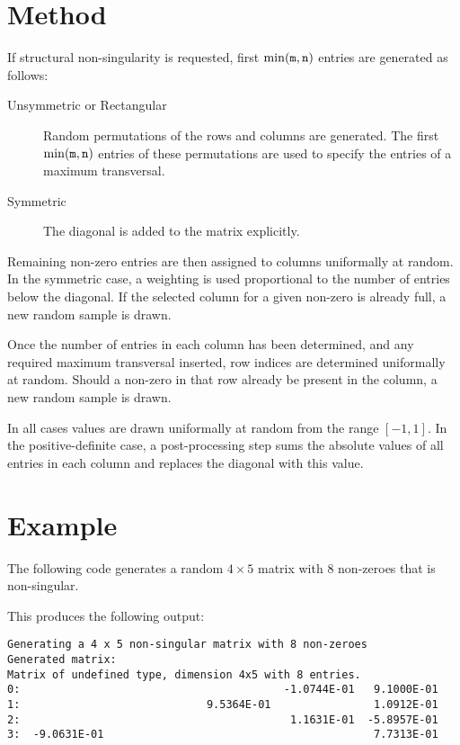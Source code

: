 \section{Method} \label{method}

If structural non-singularity is requested, first $\min({\tt m}, {\tt n})$ entries are generated as follows:
\begin{description}
   \item[Unsymmetric or Rectangular] Random permutations of the rows and
      columns are generated. The first $\min({\tt m}, {\tt n})$ entries of
      these permutations are used to specify the entries of a maximum
      transversal.
   \item[Symmetric] The diagonal is added to the matrix explicitly.
\end{description}

Remaining non-zero entries are then assigned to columns uniformally at
random. In the symmetric case, a weighting is used proportional to the number of
entries below the diagonal. If the selected column for a given non-zero is 
already full, a new random sample is drawn.

Once the number of entries in each column has been determined, and any required
maximum transversal inserted, row indices are determined uniformally at random.
Should a non-zero in that row already be present in the column, a new random
sample is drawn.

In all cases values are drawn uniformally at random from the range $[-1,1]$. In
the positive-definite case, a post-processing step sums the absolute values of
all entries in each column and replaces the diagonal with this value.


\section{Example} \label{examples}

The following code generates a random $4 \times 5$ matrix with $8$ non-zeroes
that is non-singular.

This produces the following output:
\begin{verbatim}
Generating a 4 x 5 non-singular matrix with 8 non-zeroes
Generated matrix:
Matrix of undefined type, dimension 4x5 with 8 entries.
0:                                         -1.0744E-01   9.1000E-01
1:                             9.5364E-01                1.0912E-01
2:                                          1.1631E-01  -5.8957E-01
3:  -9.0631E-01                                          7.7313E-01
\end{verbatim}

\begin{funders}
\end{funders}
